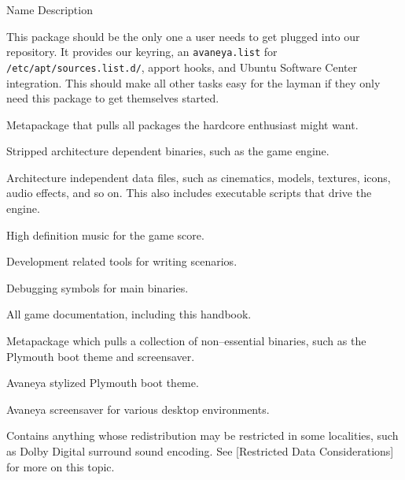 {
    \bTABLE[split=repeat,option=stretch]
    \setupTABLE[column][2]
        [width=.65\textwidth,
        align=yes]
    \setupTABLE[row][each][align=center]
    \setupTABLE[7][1][align=center]

\bTABLEhead
    \bTR[bottomframe=on]
      \bTH  Name \eTH
      \bTH  Description \eTH
    \eTR
\eTABLEhead

\bTABLEbody
    \bTR
       \eTC
      \bTC This package should be the only one a user needs to get plugged into our repository. It provides our keyring, an {\tt avaneya.list} for {\tt /etc/apt/sources.list.d/}, apport hooks, and Ubuntu Software Center integration. This should make all other tasks easy for the layman if they only need this package to get themselves started. \eTC
    \eTR

    \bTR
       \eTC
      \bTC Metapackage that pulls all packages the hardcore enthusiast might want. \eTC
    \eTR

    \bTR
       \eTC
      \bTC Stripped architecture dependent binaries, such as the game engine. \eTC
    \eTR

    \bTR
       \eTC
      \bTC Architecture independent data files, such as cinematics, models, 
textures, icons, audio effects, and so on. This also includes executable scripts 
that drive the engine. \eTC
    \eTR

    \bTR
       \eTC
      \bTC High definition music for the game score. \eTC
    \eTR

    \bTR
       \eTC
      \bTC Development related tools for writing scenarios. \eTC
    \eTR

    \bTR
       \eTC
      \bTC Debugging symbols for main binaries. \eTC
    \eTR

    \bTR
       \eTC
      \bTC All game documentation, including this handbook. \eTC
    \eTR

    \bTR
       \eTC
      \bTC Metapackage which pulls a collection of non--essential binaries, such as the Plymouth boot theme and screensaver. \eTC
    \eTR

    \bTR
       \eTC
      \bTC Avaneya stylized Plymouth boot theme. \eTC
    \eTR
    
    \bTR
       \eTC
      \bTC Avaneya screensaver for various desktop environments. \eTC
    \eTR

    \bTR
       \eTC
      \bTC Contains anything whose redistribution may be restricted in some localities, such as Dolby Digital surround sound encoding. See [Restricted Data Considerations] for more on this topic. \eTC
    \eTR
\eTABLEbody
\eTABLE
}

